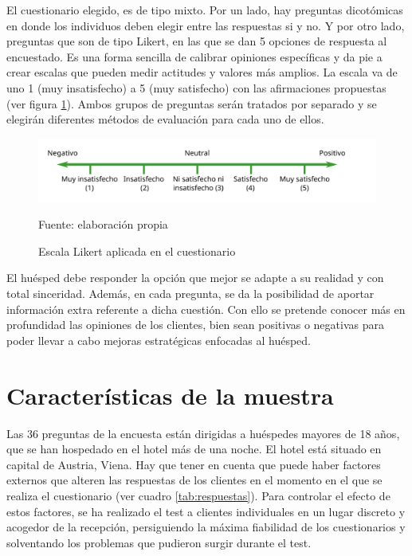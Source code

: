 El cuestionario elegido, es de tipo mixto. Por un lado, hay preguntas dicotómicas en donde los individuos deben elegir entre las respuestas si y no. Y por otro lado, preguntas que son de tipo Likert, en las que se dan 5 opciones de respuesta al encuestado. Es una forma sencilla de calibrar opiniones específicas y da pie a crear escalas que pueden medir actitudes y valores más amplios. La escala va de uno 1 (muy insatisfecho) a 5 (muy satisfecho) con las afirmaciones propuestas (ver figura \ref{fig:escala}). Ambos grupos de preguntas serán tratados por separado y se elegirán diferentes métodos de evaluación para cada uno de ellos.

\begin{figure}[!h]
	\caption{Escala Likert aplicada en el cuestionario}
	\centering \includegraphics[width=150mm]{capitulos/graficos/escala} 
	\label{fig:escala} 
	
		\footnotesize
		Fuente: elaboración propia
\end{figure}

El huésped debe responder la opción que mejor se adapte a su realidad y con total sinceridad. Además, en cada pregunta, se da la posibilidad de aportar información extra referente a dicha cuestión. Con ello se pretende conocer más en profundidad las opiniones de los clientes, bien sean positivas o negativas para poder llevar a cabo mejoras estratégicas enfocadas al huésped.

\section{Características de la muestra}

Las 36 preguntas de la encuesta están dirigidas a huéspedes mayores de 18 años, que se han hospedado en el hotel más de una noche. El hotel está situado en capital de Austria, Viena. Hay que tener en cuenta que puede haber factores externos que alteren las respuestas de los clientes en el momento en el que se realiza el cuestionario (ver cuadro \ref{tab:respuestas}). Para controlar el efecto de estos factores, se ha realizado el test a clientes individuales en un lugar discreto y acogedor de la recepción, persiguiendo la máxima fiabilidad de los cuestionarios y solventando los problemas que pudieron surgir durante el test.

